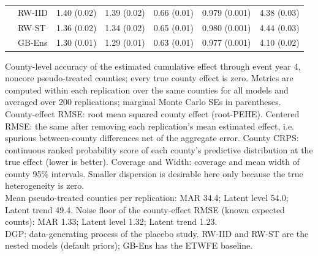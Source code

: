 \begin{table}
\begin{tabular*}{1\linewidth}{@{\extracolsep{\fill}}llrrrrr}
 & RW-IID & 1.40 (0.02) & 1.39 (0.02) & 0.66 (0.01) & 0.979 (0.001) & 4.38 (0.03) \\ 
 & RW-ST & 1.36 (0.02) & 1.34 (0.02) & 0.65 (0.01) & 0.980 (0.001) & 4.44 (0.03) \\ 
 & GB-Ens & 1.30 (0.01) & 1.29 (0.01) & 0.63 (0.01) & 0.977 (0.001) & 4.10 (0.02) \\ 
\bottomrule
\end{tabular*}
\begin{minipage}{\linewidth}
\vspace{.05em}
County-level accuracy of the estimated cumulative effect through event year 4, noncore pseudo-treated counties; every true county effect is zero. Metrics are computed within each replication over the same counties for all models and averaged over 200 replications; marginal Monte Carlo SEs in parentheses.\\
County-effect RMSE: root mean squared county effect (root-PEHE). Centered RMSE: the same after removing each replication's mean estimated effect, i.e. spurious between-county differences net of the aggregate error. County CRPS: continuous ranked probability score of each county's predictive distribution at the true effect (lower is better). Coverage and Width: coverage and mean width of county 95\% intervals. Smaller dispersion is desirable here only because the true heterogeneity is zero.\\
Mean pseudo-treated counties per replication: MAR 34.4; Latent level 54.0; Latent trend 49.4. Noise floor of the county-effect RMSE (known expected counts): MAR 1.33; Latent level 1.32; Latent trend 1.23.\\
DGP: data-generating process of the placebo study. RW-IID and RW-ST are the nested models (default priors); GB-Ens has the ETWFE baseline.\\
\end{minipage}
\end{table}

